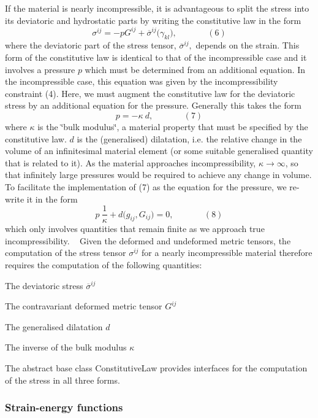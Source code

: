 \begin{DoxyEnumerate}
 If the material is nearly incompressible, it is advantageous to split the stress into its deviatoric and hydrostatic parts by writing the constitutive law in the form \[ \sigma^{ij} = -p G^{ij} + \overline{\sigma}^{ij}\big(\gamma_{kl}\big), \ \ \ \ \ \ \ \ \ \ \ \ \ \ \ \ (6) \] where the deviatoric part of the stress tensor, $ \overline{\sigma}^{ij}, $ depends on the strain. This form of the constitutive law is identical to that of the incompressible case and it involves a pressure $ p $ which must be determined from an additional equation. In the incompressible case, this equation was given by the incompressibility constraint (4). Here, we must augment the constitutive law for the deviatoric stress by an additional equation for the pressure. Generally this takes the form \[ p = - \kappa \ d, \ \ \ \ \ \ \ \ \ \ \ \ \ \ \ \ (7) \] where $ \kappa $ is the \char`\"{}bulk modulus\char`\"{}, a material property that must be specified by the constitutive law. $ d $ is the (generalised) dilatation, i.\+e. the relative change in the volume of an infinitesimal material element (or some suitable generalised quantity that is related to it). As the material approaches incompressibility, $ \kappa \to \infty$, so that infinitely large pressures would be required to achieve any change in volume. To facilitate the implementation of (7) as the equation for the pressure, we re-\/write it in the form \[ p \ \frac{1}{\kappa} + d\big(g_{ij},G_{ij}\big) = 0, \ \ \ \ \ \ \ \ \ \ \ \ \ \ \ \ (8) \] which only involves quantities that remain finite as we approach true incompressibility. ~\newline
 Given the deformed and undeformed metric tensors, the computation of the stress tensor $ \sigma^{ij} $ for a nearly incompressible material therefore requires the computation of the following quantities\+:
\begin{DoxyItemize}
\item The deviatoric stress $ \overline{\sigma}^{ij} $
\item The contravariant deformed metric tensor $ G^{ij} $
\item The generalised dilatation $ d $
\item The inverse of the bulk modulus $ \kappa $
\end{DoxyItemize}The abstract base class {\ttfamily Constitutive\+Law} provides interfaces for the computation of the stress in all three forms.
\end{DoxyEnumerate}\hypertarget{index_strain-energy}{}\subsubsection{Strain-\/energy functions}\label{index_strain-energy}
